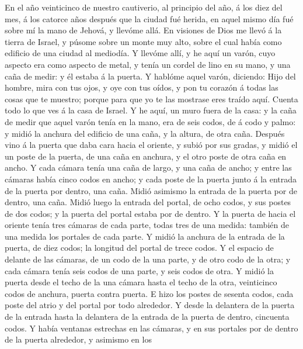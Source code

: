  En el año veinticinco de nuestro cautiverio, al principio
del año, á los diez del mes, á los catorce años después que la ciudad
fué herida, en aquel mismo día fué sobre mí la mano de Jehová, y llevóme
allá.  En visiones de Dios me llevó á la tierra de Israel,
y púsome sobre un monte muy alto, sobre el cual había como edificio de
una ciudad al mediodía.  Y llevóme allí, y he aquí un
varón, cuyo aspecto era como aspecto de metal, y tenía un cordel de lino
en su mano, y una caña de medir: y él estaba á la puerta. 
Y hablóme aquel varón, diciendo: Hijo del hombre, mira con tus ojos, y
oye con tus oídos, y pon tu corazón á todas las cosas que te muestro;
porque para que yo te las mostrase eres traído aquí. Cuenta todo lo que
ves á la casa de Israel.  Y he aquí, un muro fuera de la
casa: y la caña de medir que aquel varón tenía en la mano, era de seis
codos, de á codo y palmo: y midió la anchura del edificio de una caña, y
la altura, de otra caña.  Después vino á la puerta que
daba cara hacia el oriente, y subió por sus gradas, y midió el un poste
de la puerta, de una caña en anchura, y el otro poste de otra caña en
ancho.  Y cada cámara tenía una caña de largo, y una caña
de ancho; y entre las cámaras había cinco codos en ancho; y cada poste
de la puerta junto á la entrada de la puerta por dentro, una caña.
 Midió asimismo la entrada de la puerta por de dentro, una
caña.  Midió luego la entrada del portal, de ocho codos, y
sus postes de dos codos; y la puerta del portal estaba por de dentro.
 Y la puerta de hacia el oriente tenía tres cámaras de
cada parte, todas tres de una medida: también de una medida los portales
de cada parte.  Y midió la anchura de la entrada de la
puerta, de diez codos; la longitud del portal de trece codos.
 Y el espacio de delante de las cámaras, de un codo de la
una parte, y de otro codo de la otra; y cada cámara tenía seis codos de
una parte, y seis codos de otra.  Y midió la puerta desde
el techo de la una cámara hasta el techo de la otra, veinticinco codos
de anchura, puerta contra puerta.  E hizo los postes de
sesenta codos, cada poste del atrio y del portal por todo alrededor.
 Y desde la delantera de la puerta de la entrada hasta la
delantera de la entrada de la puerta de dentro, cincuenta codos.
 Y había ventanas estrechas en las cámaras, y en sus
portales por de dentro de la puerta alrededor, y asimismo en los
